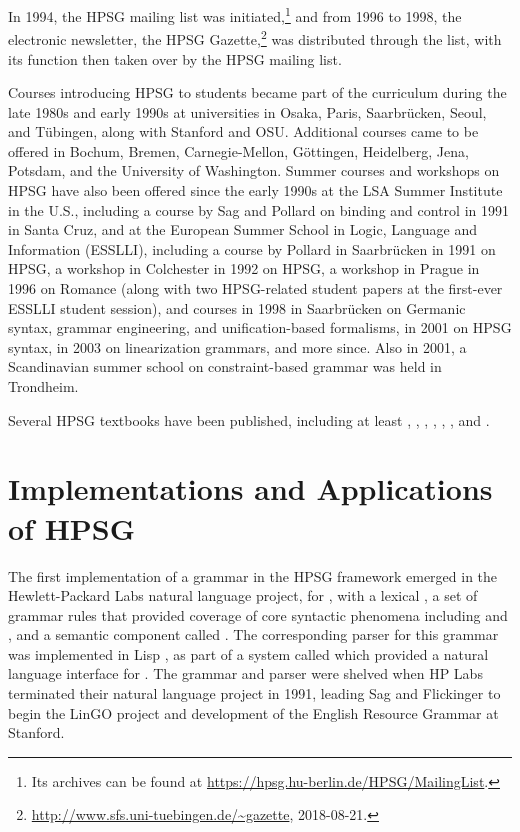 \documentclass[output=paper]{langsci/langscibook}
\begin{document}
In 1994, the HPSG mailing list was initiated,\footnote{Its archives can be found at \url{https://hpsg.hu-berlin.de/HPSG/MailingList}.} and from 1996 to 1998, the electronic newsletter, the HPSG Gazette,\footnote{\url{http://www.sfs.uni-tuebingen.de/~gazette}, 2018-08-21.} was distributed through the list, with its function then taken over by the HPSG mailing list.

Courses introducing HPSG to students became part of the curriculum during the late 1980s and early 1990s at universities in Osaka, Paris, Saarbr{\"u}cken, Seoul, and T{\"u}bingen, along with Stanford and OSU.  Additional courses came to be offered in Bochum, Bremen, Carnegie-Mellon, G{\"o}ttingen, Heidelberg, Jena, Potsdam, and the University of Washington.  Summer courses and workshops on HPSG have also been offered since the early 1990s at the LSA Summer Institute in the U.S., including a course by Sag and Pollard on binding and control in 1991 in Santa Cruz, and at the European Summer School in Logic, Language and Information (ESSLLI), including a course by Pollard in Saarbr{\"u}cken in 1991 on HPSG, a workshop in Colchester in 1992 on HPSG, a workshop in Prague in 1996 on Romance (along with two HPSG-related student papers at the first-ever ESSLLI student session), and courses in 1998 in Saarbr{\"u}cken on Germanic syntax, grammar engineering, and unification-based formalisms, in 2001 on HPSG syntax, in 2003 on linearization grammars, and more since.  Also in 2001, a Scandinavian summer school on constraint-based grammar was held in Trondheim.

Several HPSG textbooks have been published, including at least \citet{Borsley91a,Borsley96a-u}, \citet{SagW99a-Short}, \citet*{SWB2003a}, \citet{MuellerLehrbuch1,MuellerGTBuch2-linked}, \citet{MuellerGT-Eng1}, \citet{Kim2016a-u}, and \citet{Levine2017a-u}.   

\section{Implementations and Applications of HPSG}

The first implementation of a grammar in the HPSG framework emerged in the Hewlett-Packard Labs natural language project, for , with a lexical  \citep*{FPW85a}, a set of grammar rules that provided coverage of core syntactic phenomena including  and , and a semantic component called  \citep{LaubNerb1991}.  The corresponding parser for this grammar was implemented in Lisp \citep{PP85}, as part of a system called  \citep{NerProud1987} which provided a natural language interface for .  The grammar and parser were shelved when HP Labs terminated their natural language project in 1991, leading Sag and Flickinger to begin the LinGO project and development of the English Resource Grammar at Stanford.
\end{document}
